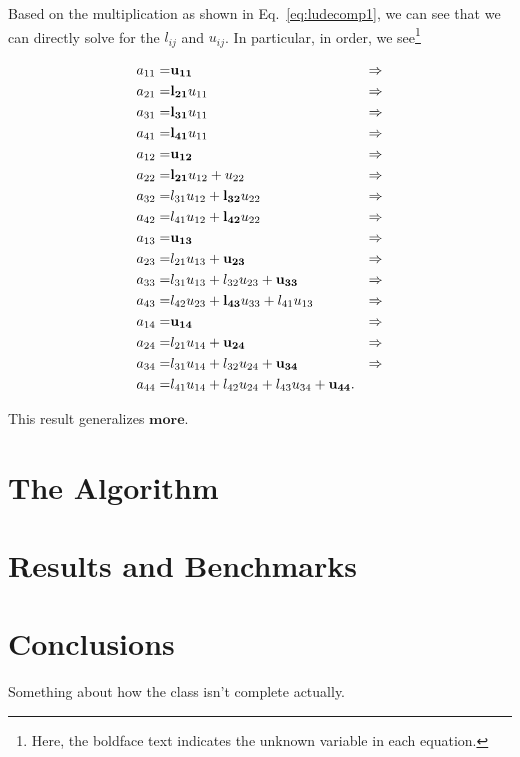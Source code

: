 \documentclass[12pt]{article}
\numberwithin{equation}{section}
\begin{document}
\noindent Based on the multiplication as shown in Eq.~\ref{eq:ludecomp1}, we can see that we can directly solve for the $l_{ij}$ and $u_{ij}$.  In particular, in order, we see\footnote{Here, the boldface text indicates the unknown variable in each equation.}

\begin{equation}
\begin{align}
a_{11} =& {\bf u_{11}} &\Rightarrow \\
a_{21} =& {\bf l_{21}} u_{11} &\Rightarrow \\
a_{31} =& {\bf l_{31}}u_{11} &\Rightarrow \\
a_{41} =& {\bf l_{41}}u_{11} &\Rightarrow \\
a_{12} =& {\bf u_{12}} &\Rightarrow \\
a_{22} =& {\bf l_{21}}u_{12}+u_{22} &\Rightarrow \\
a_{32} =& l_{31}u_{12}+{\bf l_{32}}u_{22} &\Rightarrow \\
a_{42} =& l_{41}u_{12}+{\bf l_{42}}u_{22} &\Rightarrow \\
a_{13} =& {\bf u_{13}} &\Rightarrow \\
a_{23} =& l_{21}u_{13}+{\bf u_{23}} &\Rightarrow \\
a_{33} =& l_{31}u_{13}+l_{32}u_{23}+{\bf u_{33}} &\Rightarrow \\
a_{43} =& l_{42}u_{23}+{\bf l_{43}}u_{33}+l_{41}u_{13} &\Rightarrow \\
a_{14} =& {\bf u_{14}} &\Rightarrow \\
a_{24} =& l_{21}u_{14}+{\bf u_{24}} &\Rightarrow \\
a_{34} =& l_{31}u_{14}+l_{32}u_{24}+{\bf u_{34}} &\Rightarrow \\
a_{44} =& l_{41}u_{14}+l_{42}u_{24}+l_{43}u_{34}+{\bf u_{44}}. &
\end{align}
\end{equation}

\noindent This result generalizes $\textbf{more}$.


\section{The Algorithm}
\label{sec:algorithm}

\section{Results and Benchmarks}
\label{sec:results}

\section{Conclusions}
\label{sec:conclusions}

Something about how the class isn't complete actually.
\end{document}
